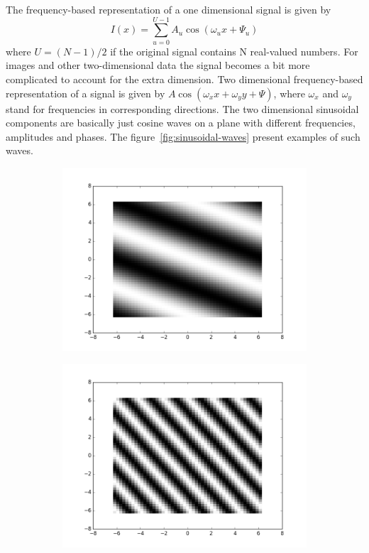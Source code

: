 \documentclass[]{article}
\begin{document}
The frequency-based representation of a one dimensional signal is given by
\begin{equation}
  I(x) = \sum_{u=0}^{U-1}{A_{u}\cos(\omega_{u}x+\Psi_{u})}
\end{equation}
where $U = (N-1)/2$ if the original signal contains N real-valued numbers. For
images and other two-dimensional data the signal becomes a bit more complicated
to account for the extra dimension. Two dimensional frequency-based
representation of a signal is given by $A \cos(\omega_{x} x + \omega_{y} y +
\Psi)$, where $\omega_{x}$ and $\omega_{y}$ stand for frequencies in
corresponding directions. The two dimensional sinusoidal components are
basically just cosine waves on a plane with different frequencies, amplitudes
and phases. The figure~\ref{fig:sinusoidal-waves} present examples of such waves.
\begin{figure}
  \centering
    \begin{subfigure}[t]{0.49\textwidth}
      \centering
      \includegraphics[width=0.99\linewidth]{sinusoidal1.png}
    \end{subfigure}
    \begin{subfigure}[t]{0.49\textwidth}
      \centering
      \includegraphics[width=0.99\linewidth]{sinusoidal2.png}

\end{subfigure}
\end{figure}
\end{document}
